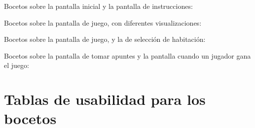 Bocetos sobre la pantalla inicial y la pantalla de instrucciones:
\begin{figure}[h]
  \centering
  \qquad
\end{figure}

\newpage

Bocetos sobre la pantalla de juego, con diferentes visualizaciones:

\begin{figure}[h]
  \qquad
\end{figure}

Bocetos sobre la pantalla de juego, y la de selección de habitación:

\begin{figure}[h]
  \centering
  \qquad
\end{figure}

\newpage

Bocetos sobre la pantalla de tomar apuntes y la pantalla cuando un jugador gana el juego:

\begin{figure}[h]
  \centering
  \qquad
\end{figure}


\section{Tablas de usabilidad para los bocetos} \label{tablas-usabilidad-bocetos}


